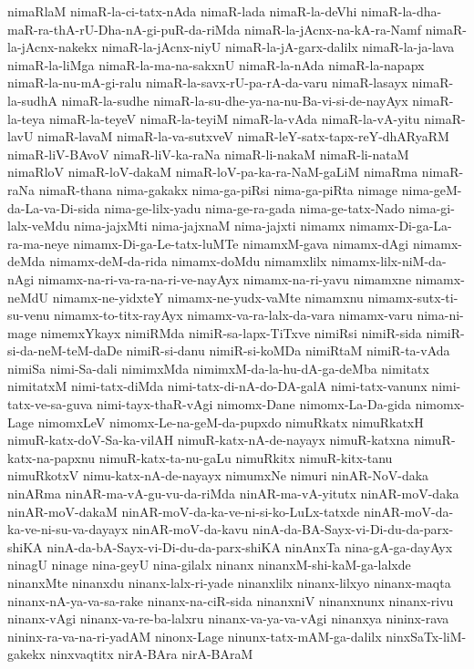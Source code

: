 {nimaRlaM
nimaR-la-ci-tatx-nAda
nimaR-lada
nimaR-la-deVhi
nimaR-la-dha-maR-ra-thA-rU-Dha-nA-gi-puR-da-riMda
nimaR-la-jAcnx-na-kA-ra-Namf
nimaR-la-jAcnx-nakekx
nimaR-la-jAcnx-niyU
nimaR-la-jA-garx-dalilx
nimaR-la-ja-lava
nimaR-la-liMga
nimaR-la-ma-na-sakxnU
nimaR-la-nAda
nimaR-la-napapx
nimaR-la-nu-mA-gi-ralu
nimaR-la-savx-rU-pa-rA-da-varu
nimaR-lasayx
nimaR-la-sudhA
nimaR-la-sudhe
nimaR-la-su-dhe-ya-na-nu-Ba-vi-si-de-nayAyx
nimaR-la-teya
nimaR-la-teyeV
nimaR-la-teyiM
nimaR-la-vAda
nimaR-la-vA-yitu
nimaR-lavU
nimaR-lavaM
nimaR-la-va-sutxveV
nimaR-leY-satx-tapx-reY-dhARyaRM
nimaR-liV-BAvoV
nimaR-liV-ka-raNa
nimaR-li-nakaM
nimaR-li-nataM
nimaRloV
nimaR-loV-dakaM
nimaR-loV-pa-ka-ra-NaM-gaLiM
nimaRma
nimaR-raNa
nimaR-thana
nima-gakakx
nima-ga-piRsi
nima-ga-piRta
nimage
nima-geM-da-La-va-Di-sida
nima-ge-lilx-yadu
nima-ge-ra-gada
nima-ge-tatx-Nado
nima-gi-lalx-veMdu
nima-jajxMti
nima-jajxnaM
nima-jajxti
nimamx
nimamx-Di-ga-La-ra-ma-neye
nimamx-Di-ga-Le-tatx-luMTe
nimamxM-gava
nimamx-dAgi
nimamx-deMda
nimamx-deM-da-rida
nimamx-doMdu
nimamxlilx
nimamx-lilx-niM-da-nAgi
nimamx-na-ri-va-ra-na-ri-ve-nayAyx
nimamx-na-ri-yavu
nimamxne
nimamx-neMdU
nimamx-ne-yidxteY
nimamx-ne-yudx-vaMte
nimamxnu
nimamx-sutx-ti-su-venu
nimamx-to-titx-rayAyx
nimamx-va-ra-lalx-da-vara
nimamx-varu
nima-ni-mage
nimemxYkayx
nimiRMda
nimiR-sa-lapx-TiTxve
nimiRsi
nimiR-sida
nimiR-si-da-neM-teM-daDe
nimiR-si-danu
nimiR-si-koMDa
nimiRtaM
nimiR-ta-vAda
nimiSa
nimi-Sa-dali
nimimxMda
nimimxM-da-la-hu-dA-ga-deMba
nimitatx
nimitatxM
nimi-tatx-diMda
nimi-tatx-di-nA-do-DA-galA
nimi-tatx-vanunx
nimi-tatx-ve-sa-guva
nimi-tayx-thaR-vAgi
nimomx-Dane
nimomx-La-Da-gida
nimomx-Lage
nimomxLeV
nimomx-Le-na-geM-da-pupxdo
nimuRkatx
nimuRkatxH
nimuR-katx-doV-Sa-ka-vilAH
nimuR-katx-nA-de-nayayx
nimuR-katxna
nimuR-katx-na-papxnu
nimuR-katx-ta-nu-gaLu
nimuRkitx
nimuR-kitx-tanu
nimuRkotxV
nimu-katx-nA-de-nayayx
nimumxNe
nimuri
ninAR-NoV-daka
ninARma
ninAR-ma-vA-gu-vu-da-riMda
ninAR-ma-vA-yitutx
ninAR-moV-daka
ninAR-moV-dakaM
ninAR-moV-da-ka-ve-ni-si-ko-LuLx-tatxde
ninAR-moV-da-ka-ve-ni-su-va-dayayx
ninAR-moV-da-kavu
ninA-da-BA-Sayx-vi-Di-du-da-parx-shiKA
ninA-da-bA-Sayx-vi-Di-du-da-parx-shiKA
ninAnxTa
nina-gA-ga-dayAyx
ninagU
ninage
nina-geyU
nina-gilalx
ninanx
ninanxM-shi-kaM-ga-lalxde
ninanxMte
ninanxdu
ninanx-lalx-ri-yade
ninanxlilx
ninanx-lilxyo
ninanx-maqta
ninanx-nA-ya-va-sa-rake
ninanx-na-ciR-sida
ninanxniV
ninanxnunx
ninanx-rivu
ninanx-vAgi
ninanx-va-re-ba-lalxru
ninanx-va-ya-va-vAgi
ninanxya
nininx-rava
nininx-ra-va-na-ri-yadAM
ninonx-Lage
ninunx-tatx-mAM-ga-dalilx
ninxSaTx-liM-gakekx
ninxvaqtitx
nirA-BAra
nirA-BAraM
}
